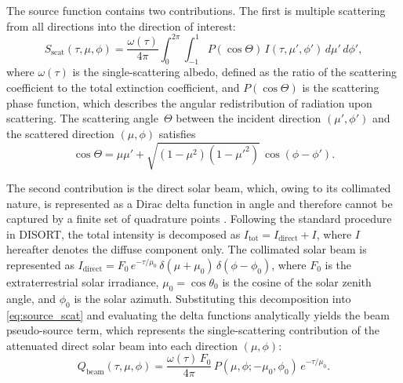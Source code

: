 \documentclass[a4paper, 11pt]{article}
\begin{document}
The source function contains two contributions.  The first is
multiple scattering from all directions into the direction of interest:
%
\begin{equation}
  S_{\text{scat}}(\tau,\mu,\phi)
  = \frac{\omega(\tau)}{4\pi}\int_{0}^{2\pi}\!\int_{-1}^{1}
    P(\cos\Theta)\,I(\tau,\mu',\phi')\,d\mu'\,d\phi',
  \label{eq:source_scat}
\end{equation}
%
where $\omega(\tau)$ is the single-scattering albedo, defined as the
ratio of the scattering coefficient to the total extinction coefficient,
and $P(\cos\Theta)$ is the scattering phase function, which describes
the angular redistribution of radiation upon scattering.  The scattering
angle~$\Theta$ between the incident direction $(\mu',\phi')$ and the
scattered direction $(\mu,\phi)$ satisfies
\cite{chandrasekhar1950}
%
\begin{equation}
  \cos\Theta = \mu\mu'
  + \sqrt{(1-\mu^2)(1-\mu'^{2})}\,\cos(\phi-\phi').
  \label{eq:cos_theta}
\end{equation}

The second contribution is the direct solar beam, which, owing to its
collimated nature, is represented as a Dirac delta function in angle
and therefore cannot be captured by a finite set of quadrature
points \cite{disortreport,thomas2002}.  Following the standard procedure
in DISORT, the total intensity is decomposed as
$I_{\text{tot}} = I_{\text{direct}} + I$, where $I$ hereafter denotes
the diffuse component only.  The collimated solar beam is represented as
$I_{\text{direct}} = F_0\,e^{-\tau/\mu_0}\,
\delta(\mu + \mu_0)\,\delta(\phi - \phi_0)$,
where $F_0$ is the extraterrestrial solar irradiance,
$\mu_0 = \cos\theta_0$ is the cosine of the solar zenith angle, and
$\phi_0$ is the solar azimuth.  Substituting this decomposition into
\eqref{eq:source_scat} and evaluating the delta functions analytically
yields the beam pseudo-source term, which represents the
single-scattering contribution of the attenuated direct solar beam
into each direction $(\mu,\phi)$:
%
\begin{equation}
  Q_{\text{beam}}(\tau,\mu,\phi)
  = \frac{\omega(\tau)\,F_0}{4\pi}\,
    P(\mu,\phi;-\mu_0,\phi_0)\,e^{-\tau/\mu_0}.
  \label{eq:q_beam}
\end{equation}
\end{document}
